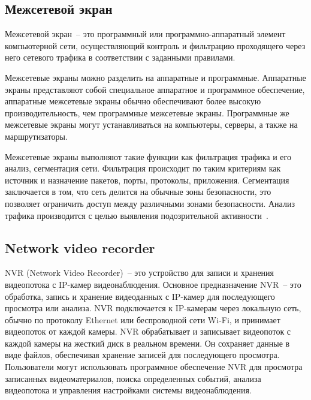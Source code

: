 \subsection{Межсетевой экран}

Межсетевой экран~-- это программный или программно-аппаратный элемент компьютерной сети, 
осуществляющий контроль и фильтрацию проходящего через него сетевого трафика в соответствии с заданными правилами.

Межсетевые экраны можно разделить на аппаратные и программные. Аппаратные экраны представляют собой 
специальное аппаратное и программное обеспечение, аппаратные межсетевые экраны обычно обеспечивают более высокую производительность, 
чем программные межсетевые экраны. Программные же межсетевые экраны могут устанавливаться на компьютеры, серверы, а также на 
маршрутизаторы. 

Межсетевые экраны выполняют такие функции как фильтрация трафика и его анализ, сегментация сети. Фильтрация 
происходит по таким критериям как источник и назначение пакетов, порты, протоколы, приложения. Сегментация
заключается в том, что сеть делится на обычные зоны безопасности, это позволяет ограничить доступ между различными зонами безопасности.
Анализ трафика производится с целью выявления подозрительной активности~\cite{computer_networks}.

\subsection{Network video recorder}

NVR (Network Video Recorder)~-- это устройство для записи и хранения видеопотока с IP-камер видеонаблюдения\cite{nvr}. 
Основное предназначение NVR~-- это обработка, запись и хранение видеоданных с IP-камер для последующего просмотра или анализа.
NVR подключается к IP-камерам через локальную сеть, обычно по протоколу Ethernet или беспроводной сети Wi-Fi, 
и принимает видеопоток от каждой камеры. NVR обрабатывает и записывает видеопоток с каждой камеры на жесткий диск в реальном времени. 
Он сохраняет данные в виде файлов, обеспечивая хранение записей для последующего просмотра.
Пользователи могут использовать программное обеспечение NVR для просмотра записанных видеоматериалов, поиска определенных событий, 
анализа видеопотока и управления настройками системы видеонаблюдения.